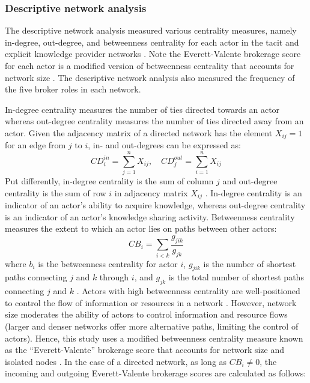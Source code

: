 \subsubsection{Descriptive network analysis} \label{sss:descriptive_network_analysis}

The descriptive network analysis measured various centrality measures, namely in-degree, out-degree, and betweenness centrality for each actor in the tacit and explicit knowledge provider networks \citep{freeman1979centrality}. Note the Everett-Valente brokerage score for each actor is a modified version of betweenness centrality that accounts for network size  \citep{everett2016bridging}. The descriptive network analysis also measured the frequency of the five \citet{gould1989structures} broker roles in each network. \medskip 

In-degree centrality measures the number of ties directed towards an actor whereas out-degree centrality measures the number of ties directed away from an actor. Given the adjacency matrix of a directed network has the element $X_{ij} = 1$ for an edge from $j$ to $i$, in- and out-degrees can be expressed as: $$CD_i^{in} = \sum_{j = 1}^nX_{ij}, \,\,\,\,\,\, CD_j^{out} = \sum_{i = 1}^nX_{ij}$$ \noindent Put differently, in-degree centrality is the sum of column $j$ and out\hyp{}degree centrality is the sum of row $i$ in adjacency matrix $X_{ij}$ \citep{newman2010networks}. In-degree centrality is an indicator of an actor's ability to acquire knowledge, whereas out-degree centrality is an indicator of an actor's knowledge sharing activity. Betweenness centrality measures the extent to which an actor lies on paths between other actors: $$ CB_i=\sum_{i < k}\frac{g_{jik}}{g_{jk}} $$ where $b_i$ is the betweenness centrality for actor $i$, $g_{jik}$ is the number of shortest paths connecting $j$ and $k$ through $i$, and $g_{jk}$ is the total number of shortest paths connecting $j$ and $k$ \citep{freeman1979centrality}. Actors with high betweenness centrality are well-positioned to control the flow of information or resources in a network \citep{everett2016bridging}. However, network size moderates the ability of actors to control information and resource flows (larger and denser networks offer more alternative paths, limiting the control of actors). Hence, this study uses a modified betweenness centrality measure known as the \enquote{Everett-Valente} brokerage score that accounts for network size and isolated nodes \citep{everett2016bridging}. In the case of a directed network, as long as $CB_i \neq 0$, the incoming and outgoing Everett-Valente brokerage scores are calculated as follows: \medskip

